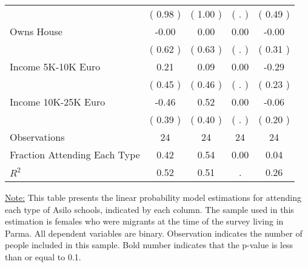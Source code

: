 \begin{table}[H]
{\begin{tabular}{lcccc}
\quad  & (     0.98 ) & (     1.00 )  & (        . )  & (     0.49 )  \\
\quad Owns House &     -0.00 &      0.00 &      0.00 &     -0.00 \\
\quad  & (     0.62 ) & (     0.63 )  & (        . )  & (     0.31 )  \\
\quad Income 5K-10K Euro &      0.21 &      0.09 &      0.00 &     -0.29 \\
\quad  & (     0.45 ) & (     0.46 )  & (        . )  & (     0.23 )  \\
\quad Income 10K-25K Euro &     -0.46 &      0.52 &      0.00 &     -0.06 \\
\quad  & (     0.39 ) & (     0.40 )  & (        . )  & (     0.20 )  \\
\midrule
Observations & 24 & 24 & 24 & 24 \\
Fraction Attending Each Type &      0.42 &      0.54 &      0.00 &      0.04 \\
\midrule
$ R^2$ &      0.52 &      0.51 &         . &      0.26 \\
\bottomrule
\end{tabular}}
\end{table}
\begin{footnotesize}
\noindent\underline{Note:} This table presents the linear probability model estimations for attending each type of Asilo schools, indicated by each column. The sample used in this estimation is females who were migrants at the time of the survey living in Parma. All dependent variables are binary. Observation indicates the number of people included in this sample. Bold number indicates that the p-value is less than or equal to 0.1.
\end{footnotesize}
